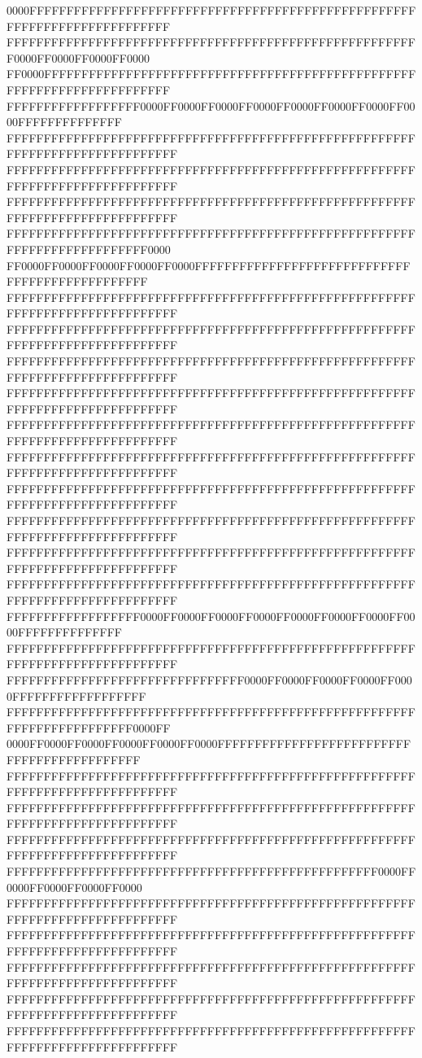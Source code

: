 0000FFFFFFFFFFFFFFFFFFFFFFFFFFFFFFFFFFFFFFFFFFFFFFFFFFFFFFFFFFFFFFFFFFFFFFFFFF
FFFFFFFFFFFFFFFFFFFFFFFFFFFFFFFFFFFFFFFFFFFFFFFFFFFFFFFF0000FF0000FF0000FF0000
FF0000FFFFFFFFFFFFFFFFFFFFFFFFFFFFFFFFFFFFFFFFFFFFFFFFFFFFFFFFFFFFFFFFFFFFFFFF
FFFFFFFFFFFFFFFFFF0000FF0000FF0000FF0000FF0000FF0000FF0000FF0000FFFFFFFFFFFFFF
FFFFFFFFFFFFFFFFFFFFFFFFFFFFFFFFFFFFFFFFFFFFFFFFFFFFFFFFFFFFFFFFFFFFFFFFFFFFFF
FFFFFFFFFFFFFFFFFFFFFFFFFFFFFFFFFFFFFFFFFFFFFFFFFFFFFFFFFFFFFFFFFFFFFFFFFFFFFF
FFFFFFFFFFFFFFFFFFFFFFFFFFFFFFFFFFFFFFFFFFFFFFFFFFFFFFFFFFFFFFFFFFFFFFFFFFFFFF
FFFFFFFFFFFFFFFFFFFFFFFFFFFFFFFFFFFFFFFFFFFFFFFFFFFFFFFFFFFFFFFFFFFFFFFFFF0000
FF0000FF0000FF0000FF0000FF0000FFFFFFFFFFFFFFFFFFFFFFFFFFFFFFFFFFFFFFFFFFFFFFFF
FFFFFFFFFFFFFFFFFFFFFFFFFFFFFFFFFFFFFFFFFFFFFFFFFFFFFFFFFFFFFFFFFFFFFFFFFFFFFF
FFFFFFFFFFFFFFFFFFFFFFFFFFFFFFFFFFFFFFFFFFFFFFFFFFFFFFFFFFFFFFFFFFFFFFFFFFFFFF
FFFFFFFFFFFFFFFFFFFFFFFFFFFFFFFFFFFFFFFFFFFFFFFFFFFFFFFFFFFFFFFFFFFFFFFFFFFFFF
FFFFFFFFFFFFFFFFFFFFFFFFFFFFFFFFFFFFFFFFFFFFFFFFFFFFFFFFFFFFFFFFFFFFFFFFFFFFFF
FFFFFFFFFFFFFFFFFFFFFFFFFFFFFFFFFFFFFFFFFFFFFFFFFFFFFFFFFFFFFFFFFFFFFFFFFFFFFF
FFFFFFFFFFFFFFFFFFFFFFFFFFFFFFFFFFFFFFFFFFFFFFFFFFFFFFFFFFFFFFFFFFFFFFFFFFFFFF
FFFFFFFFFFFFFFFFFFFFFFFFFFFFFFFFFFFFFFFFFFFFFFFFFFFFFFFFFFFFFFFFFFFFFFFFFFFFFF
FFFFFFFFFFFFFFFFFFFFFFFFFFFFFFFFFFFFFFFFFFFFFFFFFFFFFFFFFFFFFFFFFFFFFFFFFFFFFF
FFFFFFFFFFFFFFFFFFFFFFFFFFFFFFFFFFFFFFFFFFFFFFFFFFFFFFFFFFFFFFFFFFFFFFFFFFFFFF
FFFFFFFFFFFFFFFFFFFFFFFFFFFFFFFFFFFFFFFFFFFFFFFFFFFFFFFFFFFFFFFFFFFFFFFFFFFFFF
FFFFFFFFFFFFFFFFFF0000FF0000FF0000FF0000FF0000FF0000FF0000FF0000FFFFFFFFFFFFFF
FFFFFFFFFFFFFFFFFFFFFFFFFFFFFFFFFFFFFFFFFFFFFFFFFFFFFFFFFFFFFFFFFFFFFFFFFFFFFF
FFFFFFFFFFFFFFFFFFFFFFFFFFFFFFFF0000FF0000FF0000FF0000FF0000FFFFFFFFFFFFFFFFFF
FFFFFFFFFFFFFFFFFFFFFFFFFFFFFFFFFFFFFFFFFFFFFFFFFFFFFFFFFFFFFFFFFFFFFFFF0000FF
0000FF0000FF0000FF0000FF0000FF0000FFFFFFFFFFFFFFFFFFFFFFFFFFFFFFFFFFFFFFFFFFFF
FFFFFFFFFFFFFFFFFFFFFFFFFFFFFFFFFFFFFFFFFFFFFFFFFFFFFFFFFFFFFFFFFFFFFFFFFFFFFF
FFFFFFFFFFFFFFFFFFFFFFFFFFFFFFFFFFFFFFFFFFFFFFFFFFFFFFFFFFFFFFFFFFFFFFFFFFFFFF
FFFFFFFFFFFFFFFFFFFFFFFFFFFFFFFFFFFFFFFFFFFFFFFFFFFFFFFFFFFFFFFFFFFFFFFFFFFFFF
FFFFFFFFFFFFFFFFFFFFFFFFFFFFFFFFFFFFFFFFFFFFFFFFFF0000FF0000FF0000FF0000FF0000
FFFFFFFFFFFFFFFFFFFFFFFFFFFFFFFFFFFFFFFFFFFFFFFFFFFFFFFFFFFFFFFFFFFFFFFFFFFFFF
FFFFFFFFFFFFFFFFFFFFFFFFFFFFFFFFFFFFFFFFFFFFFFFFFFFFFFFFFFFFFFFFFFFFFFFFFFFFFF
FFFFFFFFFFFFFFFFFFFFFFFFFFFFFFFFFFFFFFFFFFFFFFFFFFFFFFFFFFFFFFFFFFFFFFFFFFFFFF
FFFFFFFFFFFFFFFFFFFFFFFFFFFFFFFFFFFFFFFFFFFFFFFFFFFFFFFFFFFFFFFFFFFFFFFFFFFFFF
FFFFFFFFFFFFFFFFFFFFFFFFFFFFFFFFFFFFFFFFFFFFFFFFFFFFFFFFFFFFFFFFFFFFFFFFFFFFFF
